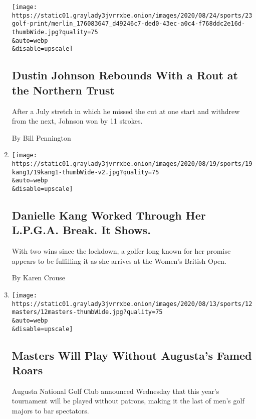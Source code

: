 \begin{enumerate}
  \texttt{[image: https://static01.graylady3jvrrxbe.onion/images/2020/08/24/sports/23golf-print/merlin\_176083647\_d49246c7-ded0-43ec-a0c4-f768ddc2e16d-thumbWide.jpg?quality=75\\\&auto=webp\\\&disable=upscale]}

  \hypertarget{dustin-johnson-rebounds-with-a-rout-at-the-northern-trust}{%
  \subsection{Dustin Johnson Rebounds With a Rout at the Northern
  Trust}\label{dustin-johnson-rebounds-with-a-rout-at-the-northern-trust}}

  After a July stretch in which he missed the cut at one start and
  withdrew from the next, Johnson won by 11 strokes.

  By Bill Pennington
\item
  \href{/2020/08/19/sports/golf/danielle-kang-womens-british-open.html}{}

  \texttt{[image: https://static01.graylady3jvrrxbe.onion/images/2020/08/19/sports/19kang1/19kang1-thumbWide-v2.jpg?quality=75\\\&auto=webp\\\&disable=upscale]}

  \hypertarget{danielle-kang-worked-through-her-lpga-break-it-shows}{%
  \subsection{Danielle Kang Worked Through Her L.P.G.A. Break. It
  Shows.}\label{danielle-kang-worked-through-her-lpga-break-it-shows}}

  With two wins since the lockdown, a golfer long known for her promise
  appears to be fulfilling it as she arrives at the Women's British
  Open.

  By Karen Crouse
\item
  \href{/2020/08/12/sports/golf/masters-no-fans-patrons.html}{}

  \texttt{[image: https://static01.graylady3jvrrxbe.onion/images/2020/08/13/sports/12masters/12masters-thumbWide.jpg?quality=75\\\&auto=webp\\\&disable=upscale]}

  \hypertarget{masters-will-play-without-augustas-famed-roars}{%
  \subsection{Masters Will Play Without Augusta's Famed
  Roars}\label{masters-will-play-without-augustas-famed-roars}}

  Augusta National Golf Club announced Wednesday that this year's
  tournament will be played without patrons, making it the last of men's
  golf majors to bar spectators.


\end{enumerate}
